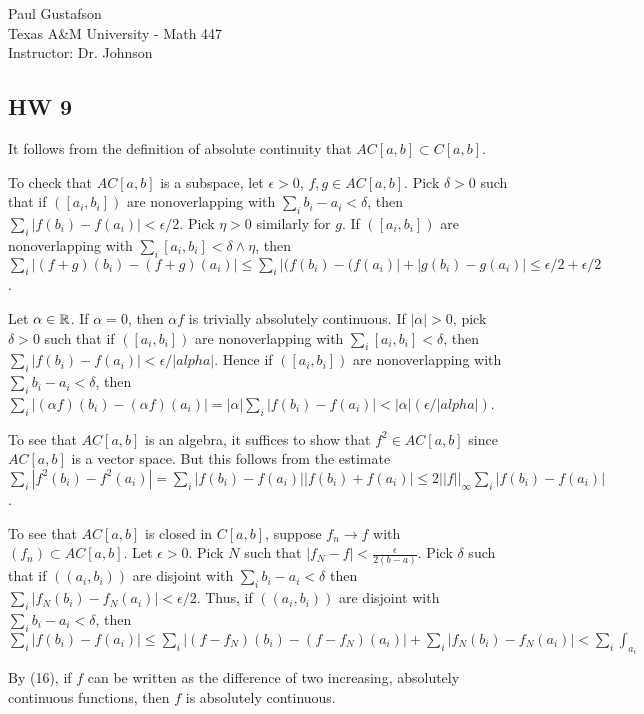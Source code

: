 \documentclass{article}
\begin{document}
\noindent Paul Gustafson\\
\noindent Texas A\&M University - Math 447\\ 
\noindent Instructor: Dr. Johnson

\subsection*{HW 9}
 It follows from the definition of absolute continuity that $AC[a,b] \subset C[a,b]$. 

To check that $AC[a,b]$ is a subspace, let $\epsilon > 0$, $f,g \in AC[a,b]$.  Pick $\delta > 0$ such that if $([a_i,b_i])$ are nonoverlapping with $\sum_i b_i - a_i < \delta$, then $\sum_i |f(b_i) - f(a_i)| < \epsilon/2$. Pick $\eta > 0$ similarly for $g$. If $([a_i,b_i])$ are nonoverlapping with $\sum_i [a_i, b_i] < \delta \wedge \eta$, then 
$\sum_i |(f+g)(b_i) - (f+g)(a_i)|
\le \sum_i |(f(b_i) - (f(a_i)| + |g(b_i) - g(a_i)|
\le \epsilon/2 + \epsilon/2$.

Let $\alpha \in \mathbb{R}$. If $\alpha = 0$, then $\alpha f$ is trivially absolutely continuous.  If $|\alpha| > 0$, pick $\delta > 0$ such that if $([a_i,b_i])$ are nonoverlapping with $\sum_i [a_i, b_i] < \delta$, then $\sum_i |f(b_i) - f(a_i)| < \epsilon/|alpha|$.  Hence if $([a_i,b_i])$ are nonoverlapping with $\sum_i b_i - a_i < \delta$, then $\sum_i |(\alpha f)(b_i) - (\alpha f)(a_i)| = |\alpha| \sum_i |f(b_i) - f(a_i)| < |\alpha| (\epsilon/|alpha|)$.

To see that $AC[a,b]$ is an algebra, it suffices to show that $f^2 \in AC[a,b]$ since $AC[a,b]$ is a vector space. But this follows from the estimate $\sum_i |f^2(b_i) - f^2(a_i)| = \sum_i |f(b_i) - f(a_i)| |f(b_i) + f(a_i)| \le 2 ||f||_\infty \sum_i |f(b_i) - f(a_i)|$.

To see that $AC[a,b]$ is closed in $C[a,b]$, suppose $f_n \to f$ with $(f_n) \subset AC[a,b]$. Let $\epsilon > 0$.  Pick $N$ such that $|f_N - f| < \frac \epsilon {2(b-a)}$.  Pick $\delta$ such that if $((a_i,b_i))$ are disjoint with $\sum_i b_i - a_i < \delta$ then $\sum_i |f_N(b_i) - f_N(a_i)| < \epsilon/2$.
Thus, if $((a_i,b_i))$ are disjoint with $\sum_i b_i - a_i < \delta$, then
$\sum_i |f(b_i) - f(a_i)| \le \sum_i |(f-f_N)(b_i) - (f-f_N)(a_i)| + \sum_i |f_N(b_i) - f_N(a_i)| < \sum_i \int_{a_i}$ %

 By (16), if $f$ can be written as the difference of two increasing, absolutely continuous functions, then $f$ is absolutely continuous.
\end{document}

